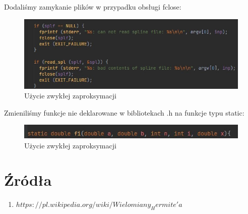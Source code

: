 \documentclass[10pt, a4paper]{report}
\begin{document}
    Dodaliśmy zamykanie plików w przypadku obsługi fclose:
    \begin{figure}[h]
        \begin{center}
            \includegraphics[scale=0.7]{error2.jpg}
            \caption{Użycie zwykłej zaproksymacji}
        \end{center}
    \end{figure}

    Zmieniliśmy funkcje nie deklarowane w bibliotekach .h na funkcje typu static: 
    \begin{figure}[h]
        \begin{center}
            \includegraphics[scale=0.8]{error3.jpg}
            \caption{Użycie zwykłej zaproksymacji}
        \end{center}
    \end{figure}    

    \section{Źródła}
    \begin{enumerate}
        \item $https://pl.wikipedia.org/wiki/Wielomiany_Hermite'a$
    \end{enumerate}
\end{document}
